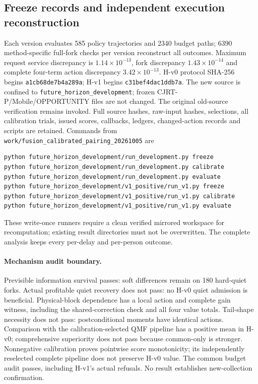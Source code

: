 \subsection{Freeze records and independent execution reconstruction}
Each version evaluates 585 policy trajectories and 2340 budget paths;
6390 method-specific full-fork checks per version reconstruct all outcomes.
Maximum request service discrepancy is $1.14\times10^{-13}$, fork discrepancy
$1.43\times10^{-14}$ and complete four-term action discrepancy
$3.42\times10^{-13}$. H-v0 protocol SHA-256 begins
\texttt{a1cb68de7b4a289a}; H-v1 begins \texttt{c31bef4dac1ddb7a}.
The new source is confined to
\texttt{future\_horizon\_development}; frozen CJRT-P/Mobile/OPPORTUNITY files
are not changed. The original old-source verification remains invoked.
Full source hashes, raw-input hashes, selections, all calibration trials,
issued scores, callbacks, ledgers, changed-action records and scripts are
retained. Commands from \texttt{work/fusion\_calibrated\_pairing\_20261005} are
\begin{verbatim}
python future_horizon_development/run_development.py freeze
python future_horizon_development/run_development.py calibrate
python future_horizon_development/run_development.py evaluate
python future_horizon_development/v1_positive/run_v1.py freeze
python future_horizon_development/v1_positive/run_v1.py calibrate
python future_horizon_development/v1_positive/run_v1.py evaluate
\end{verbatim}
These write-once runners require a clean verified mirrored workspace for
recomputation; existing result directories must not be overwritten.
The complete analysis keeps every per-delay and per-person outcome.

\paragraph{Mechanism audit boundary.}
Previsible information survival passes: soft differences remain on 180
hard-quiet forks. Actual profitable quiet recovery does not pass: no H-v0
quiet admission is beneficial. Physical-block dependence has a local action
and complete gain witness, including the shared-correction check and all
four value totals. Tail-shape necessity does not pass: postconditional
moments have identical actions. Comparison with the calibration-selected
QMF pipeline has a positive mean in H-v0; comprehensive superiority does
not pass because common-only is stronger. Nonnegative calibration proves
pointwise score monotonicity; its independently reselected complete pipeline
does not preserve H-v0 value. The common budget audit passes, including
H-v1's actual refusals. No result establishes new-collection confirmation.
